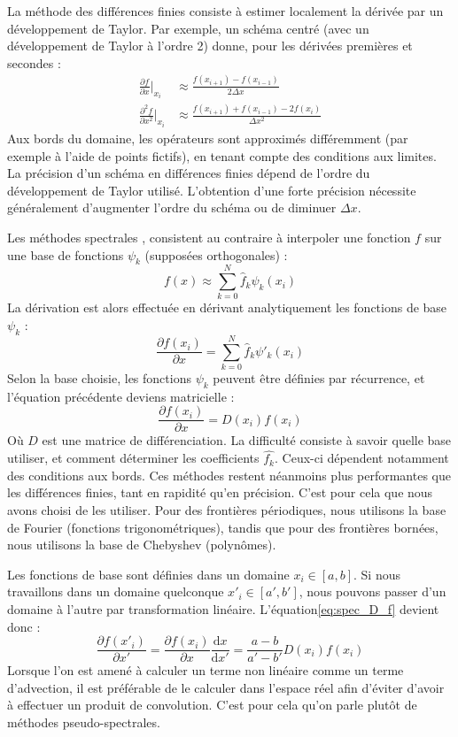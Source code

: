 La méthode des différences finies consiste à estimer localement la dérivée par un développement de Taylor. Par exemple, un schéma centré (avec un développement de Taylor à l'ordre 2) donne, pour les dérivées premières et secondes :  
\begin{align}
	\frac{\partial f}{\partial x}|_{x_i} &\approx \frac{f(x_{i+1}) -f(x_{i-1})}{2\Delta x} \\
	\frac{\partial^2 f}{\partial x^2}|_{x_i} &\approx \frac{f(x_{i+1}) + f(x_{i-1}) - 2f(x_i)}{\Delta x^2}
\end{align}
Aux bords du domaine, les opérateurs sont approximés différemment (par exemple à l'aide de points fictifs), en tenant compte des conditions aux limites. La précision d'un schéma en différences finies dépend de l'ordre du développement de Taylor utilisé. L'obtention d'une forte précision nécessite généralement d'augmenter l'ordre du schéma ou de diminuer $\Delta x$.

Les méthodes spectrales \parencite{Trefethen2000} \parencite{Boyd} \parencite{Peyret2001}, consistent au contraire à interpoler une fonction $f$ sur une base de fonctions $\psi_k$ (supposées orthogonales) : 
\begin{equation}
	f(x) \approx \sum_{k=0}^N \hat{f}_k \psi_k(x_i)
\end{equation}
La dérivation est alors effectuée en dérivant analytiquement les fonctions de base $\psi_k$ :
\begin{equation}
	\frac{\partial f(x_i)}{\partial x} = \sum_{k=0}^N \hat{f}_k \psi'_k(x_i)
\end{equation}
Selon la base choisie, les fonctions $\psi_k$ peuvent être définies par récurrence, et l'équation précédente deviens matricielle : 
\begin{equation}
	\frac{\partial f(x_i)}{\partial x} = D(x_i) f(x_i)
	\label{eq:spec_D_f}
\end{equation}
Où $D$ est une matrice de différenciation.
La difficulté consiste à savoir quelle base utiliser, et comment déterminer les coefficients $\hat{f_k}$. Ceux-ci dépendent notamment des conditions aux bords. Ces méthodes restent néanmoins plus performantes que les différences finies, tant en rapidité qu'en précision. C'est pour cela que nous avons choisi de les utiliser. Pour des frontières périodiques, nous utilisons la base de Fourier (fonctions trigonométriques), tandis que pour des frontières bornées, nous utilisons la base de Chebyshev (polynômes).

Les fonctions de base sont définies dans un domaine $x_i \in [a, b]$. Si nous travaillons dans un domaine quelconque $x'_i \in [a', b']$, nous pouvons passer d'un domaine à l'autre par transformation linéaire.
L'équation\ref{eq:spec_D_f} devient donc : 
\begin{equation}
	\frac{\partial f(x'_i)}{\partial x'} = \frac{\partial f(x_i)}{\partial x}\frac{\mathrm{d}x}{\mathrm{d}x'} = \frac{a-b}{a'-b'}D(x_i) f(x_i)
\end{equation}
Lorsque l'on est amené à calculer un terme non linéaire comme un terme d'advection, il est préférable de le calculer dans l'espace réel afin d'éviter d'avoir à effectuer un produit de convolution. C'est pour cela qu'on parle plutôt de méthodes pseudo-spectrales. 

